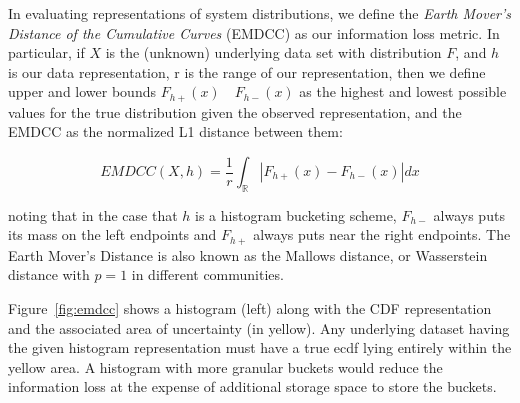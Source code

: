 \documentclass[preprint]{sig-alternate-per}
\begin{document}

%

In evaluating representations of system distributions, we define the
\emph{Earth Mover's Distance of the Cumulative Curves} (EMDCC) as our information
loss metric.  In particular, if $X$ is the (unknown) underlying data set with
distribution $F$, and $h$ is our data representation, r is the range of our representation,
then we define upper and lower bounds $F_{h+}(x) \quad F_{h-}(x)$ as the highest and lowest possible
values for the true distribution given the observed representation, and the
EMDCC as the normalized L1 distance between them:

$$ EMDCC(X, h) = \frac{1}{r} \int_{\mathbb{R}} |F_{h+}(x) - F_{h-}(x)|dx $$

\noindent noting that in the case that $h$ is a histogram bucketing scheme,
$F_{h-}$ always puts its mass on the left endpoints and $F_{h+}$ always puts
near the right endpoints.  The Earth Mover's Distance
\cite{rubner2000earth} is also known as the
Mallows distance, or Wasserstein distance with $p=1$ in
different communities.

Figure~\ref{fig:emdcc} shows a histogram (left) along with the CDF representation and the
associated area of uncertainty (in yellow).  Any underlying dataset
having the given histogram representation must have a true ecdf lying
entirely within the yellow area.  A histogram with more granular
buckets would reduce the information loss at the expense of additional
storage space to store the buckets.
\end{document}
